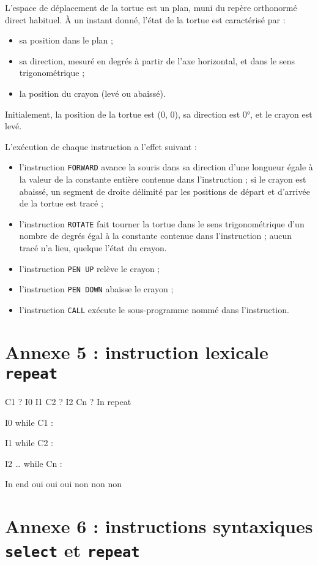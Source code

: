 L'espace de déplacement de la tortue est un plan, muni du repère orthonormé direct habituel. À un instant donné, l'état de la tortue est caractérisé par :
\begin{itemize}
  \item sa position dans le plan ;
  \item sa direction, mesuré en degrés à partir de l'axe horizontal, et dans le sens trigonométrique ;
  \item la position du crayon (levé ou abaissé).
\end{itemize}

Initialement, la position de la tortue est (0, 0), sa direction est 0°, et le crayon est levé.

L'exécution de chaque instruction a l'effet suivant :
\begin{itemize}
  \item l'instruction \texttt{FORWARD} avance la souris dans sa direction d'une longueur égale à la valeur de la constante entière contenue dans l'instruction ; si le crayon est abaissé, un segment de droite délimité par les positions de départ et d'arrivée de la tortue est tracé ;
  \item l'instruction \texttt{ROTATE} fait tourner la tortue dans le sens trigonométrique d'un nombre de degrés égal à la constante contenue dans l'instruction ; aucun tracé n'a lieu, quelque l'état du crayon.
  \item l'instruction \texttt{PEN UP} relève le crayon ;
  \item l'instruction \texttt{PEN DOWN} abaisse le crayon ;
  \item l'instruction \texttt{CALL} exécute le sous-programme nommé dans l'instruction.
\end{itemize}



\section {Annexe 5 : instruction lexicale \texttt{repeat}}
C1 ?
I0
I1
C2 ?
I2
Cn ?
In
repeat

I0
while C1 :

I1
while C2 :

I2
…
while Cn :

In
end
oui
oui
oui
non
non
non

\section{Annexe 6 : instructions syntaxiques \texttt{select} et \texttt{repeat}}

